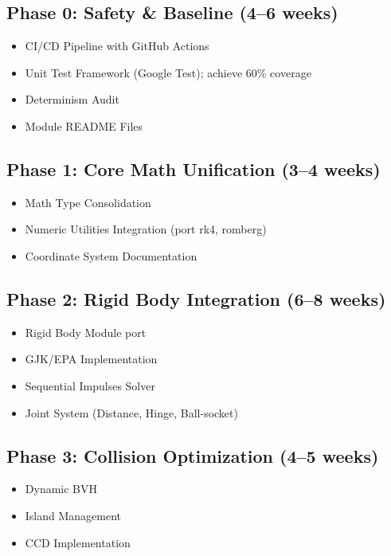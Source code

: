 \documentclass[11pt]{article}
\begin{document}
\subsection{Phase 0: Safety \& Baseline (4--6 weeks)}

\begin{itemize}
  \item CI/CD Pipeline with GitHub Actions
  \item Unit Test Framework (Google Test); achieve 60\% coverage
  \item Determinism Audit
  \item Module README Files
\end{itemize}

\subsection{Phase 1: Core Math Unification (3--4 weeks)}

\begin{itemize}
  \item Math Type Consolidation
  \item Numeric Utilities Integration (port rk4, romberg)
  \item Coordinate System Documentation
\end{itemize}

\subsection{Phase 2: Rigid Body Integration (6--8 weeks)}

\begin{itemize}
  \item Rigid Body Module port
  \item GJK/EPA Implementation
  \item Sequential Impulses Solver
  \item Joint System (Distance, Hinge, Ball-socket)
\end{itemize}

\subsection{Phase 3: Collision Optimization (4--5 weeks)}

\begin{itemize}
  \item Dynamic BVH
  \item Island Management
  \item CCD Implementation
\end{itemize}
\end{document}

